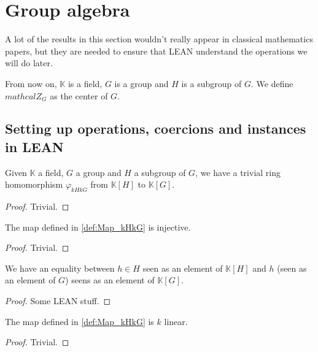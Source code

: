 \section{Group algebra}
A lot of the results in this section wouldn't really appear in classical mathematics papers, but they
are needed to ensure that LEAN understand the operations we will do later.
\newline

From now on, $\mathbb{K}$ is a field, $G$ is a group and $H$ is a subgroup of $G$.
We define $mathcal{Z}_G$ as the center of $G$.

\subsection{Setting up operations, coercions and instances in LEAN}

\begin{definition}
    \label{def:Map_kHkG}
    \leanok
    Given $\mathbb{K}$ a field, $G$ a group and $H$ a subgroup of $G$, 
    we have a trivial ring homomorphism $\varphi_{kHkG}$ from $\mathbb{K}[H]$ to $\mathbb{K}[G]$.
    \begin{proof}
        \leanok
        Trivial.
    \end{proof}
\end{definition}

\begin{proposition}
    \label{prop:Map_kHkG_inj}
    \leanok
    The map defined in \ref{def:Map_kHkG} is injective.
\end{proposition}
\begin{proof}
    \leanok
    Trivial.
\end{proof}

\begin{proposition}
    \label{prop:Map_kHkG_single_apply}
    \leanok
    We have an equality between $h\in H$ seen as an element of $\mathbb{K}[H]$ and $h$ (seen as an element 
    of $G$) seens as an element of $\mathbb{K}[G]$.
\end{proposition}
\begin{proof}
    \leanok
    Some LEAN stuff.
\end{proof}

\begin{proposition}
    \label{prop:Map_kHkG_k_linear}
    \leanok
    The map defined in \ref{def:Map_kHkG} is $k$ linear.
\end{proposition}
\begin{proof}
    \leanok
    Trivial.
\end{proof}

